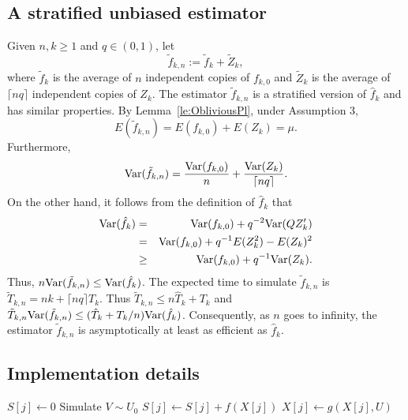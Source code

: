 \documentclass[a4paper,11pt]{article}
\begin{document}
\subsection{A stratified unbiased  estimator}\label{sub:strat}
Given \(n,k\ge1\) and \(q\in(0,1)\), let
\begin{equation*}
\tilde f_{k,n}:=\tilde f_{k}+\tilde Z_{k},
\end{equation*} 
where \(\tilde f_{k}\) is the average of \(n\) independent copies of \(f_{k,0}\) and \(\tilde Z_{k}\) is the average of \(\lceil nq\rceil\) independent copies of \(Z_{k}\). The estimator  \(\tilde f_{k,n}\) is a stratified version of \(\hat f_{k}\) and has similar properties. By Lemma~\ref{le:ObliviousPl}, under Assumption 3, \begin{displaymath}
E(\tilde f_{k,n})=E(f_{k,0})+E(Z_{k})=\mu.
\end{displaymath}
Furthermore,
\begin{equation*}
{\rm Var}(\tilde f_{k,n})=\frac{{\rm Var}(f_{k,0})}{n}+\frac{{\rm Var}(Z_{k})}{\lceil nq\rceil}.
\end{equation*}
On the other hand, it follows from the definition of   \(\hat f_{k}\) that 
\begin{eqnarray*}
{\rm Var}(\hat f_{k})
&=&{\rm Var}(f_{k,0})+q^{-2}{\rm Var}(QZ'_{k})\\
&=&{\rm Var}(f_{k,0})+q^{-1}E(Z_{k}^{2})-E(Z_{k})^{2}\\
&\ge&{\rm Var}(f_{k,0})+q^{-1}{\rm Var}(Z_{k}).
\end{eqnarray*}Thus, \(n{\rm Var}(\tilde f_{k,n})\leq{\rm Var}(\hat f_{k})\). The expected time to simulate \(\tilde f_{k,n}\) is \(\tilde T_{k,n}=nk+\lceil nq\rceil T_{k}\). Thus  \(\tilde T_{k,n}\le n\hat T_{k}+ T_{k}\) and  \(\tilde T_{k,n}{\rm Var}(\tilde f_{k,n})\leq( \hat T_{k}+ T_{k}/n){\rm Var}(\hat f_{k})\).  Consequently, as \(n\) goes to infinity, the estimator \(\tilde f_{k,n}\) is asymptotically at least as efficient as  \(\hat f_{k}\).   
\subsection{Implementation details}\label{sub:implementationDetails}
\begin{algorithm}[H]
\caption{Procedure LongRun}
\label{alg:LR}
\begin{algorithmic}[1]
\State \(
S[j]\gets 0
\)
\EndFor
{} 
\State Simulate \(V\sim U_{0}\)
\State \(S[j]\gets S[j]+ f(X[j])\)
\EndIf
\State \(X[j]\gets g(X[j],U)\)
\EndFor
\EndFor
\EndProcedure
\end{algorithmic}
\end{algorithm}
\end{document}
